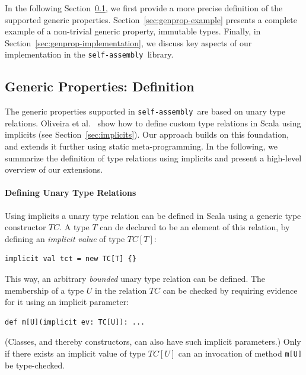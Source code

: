 \documentclass[preprint]{sigplanconf}
\newcommand{\selfassembly}{\texttt{self-assembly~}}
\begin{document}
In the following Section~\ref{sec:genprop-definition}, we first provide a more
precise definition of the supported generic properties.
Section~\ref{sec:genprop-example} presents a complete example of a non-trivial generic
property, immutable types. Finally, in Section~\ref{sec:genprop-implementation}, we discuss
key aspects of our implementation in the \selfassembly library.



\subsection{Generic Properties: Definition}\label{sec:genprop-definition}

The generic properties supported in \selfassembly are based on unary type
relations. Oliveira et al.~\cite{Oliveira2010} show how to define custom type
relations in Scala using implicits (see Section~\ref{sec:implicits}). Our
approach builds on this foundation, and extends it further using static
meta-programming. In the following, we summarize the definition of type relations
using implicits and present a high-level overview of our extensions.

\paragraph{Defining Unary Type Relations}

Using implicits a unary type relation can be defined in Scala using a generic
type constructor $TC$. A type $T$ can de declared to be an element of this
relation, by defining an {\em implicit value} of type $TC[T]$:

\begin{lstlisting}
implicit val tct = new TC[T] {}
\end{lstlisting}
\noindent
This way, an arbitrary {\em bounded} unary type relation can be defined. The
membership of a type $U$ in the relation $TC$ can be checked by requiring evidence
for it using an implicit parameter:

\begin{lstlisting}
def m[U](implicit ev: TC[U]): ...
\end{lstlisting}
\noindent
(Classes, and thereby constructors, can also have such implicit parameters.)
Only if there exists an implicit value of type $TC[U]$ can an invocation
of method \verb|m[U]| be type-checked.
\end{document}
